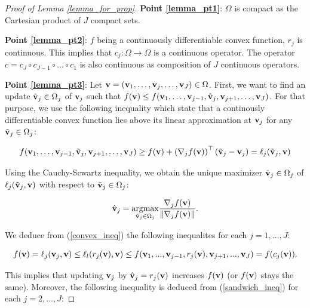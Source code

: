 \documentclass[
]{jss}
\begin{document}
\begin{proof}[Proof of Lemma \ref{lemma_for_prop}]

    \textbf{Point \ref{lemma_pt1}}: $\Omega$ is compact as the Cartesian product 
    of $J$ compact sets.

    \textbf{Point \ref{lemma_pt2}}: $f$ being a continuously differentiable convex 
    function, $r_j$ is continuous. This implies that $c_j: \Omega \to \Omega$ is a 
    continuous operator. The operator  
    $c = c_J \circ c_{J-1} \circ \ldots \circ c_1$ is also continuous as 
    composition of $J$ continuous operators.

    \textbf{Point \ref{lemma_pt3}}: 
    Let $\mathbf{v} = (\mathbf{v}_1, \ldots, \mathbf{v}_j, \ldots, \mathbf{v}_J) \in \Omega$. First, 
    we want to find an update $\hat{\mathbf{v}}_j \in \Omega_j$ of $\mathbf{v}_j$ such that 
    $f(\mathbf{v}) \le f(\mathbf{v}_1, \ldots, \mathbf{v}_{j-1}, \hat{\mathbf{v}}_j, \mathbf{v}_{j+1}, \ldots , \mathbf{v}_J)$. 
    For that purpose, we use the following inequality which state that a 
    continously differentiable convex function lies above its linear approximation 
    at $\mathbf{v}_j$ for any $\tilde{\mathbf{v}}_j \in \Omega_j$:

\begin{equation}
f(\mathbf{v}_1, \ldots, \mathbf{v}_{j-1}, \tilde{\mathbf{v}}_j, \mathbf{v}_{j+1}, \ldots , \mathbf{v}_J) \ge f(\mathbf{v})+  \left(\mathbf{\nabla}_j f(\mathbf{v})\right)^\top (\tilde{\mathbf{v}}_j - \mathbf{v}_j) =  \ell_j(\tilde{\mathbf{v}}_j, \mathbf{v})
\label{convex_ineq}
\end{equation}

Using the Cauchy-Scwartz inequality, we obtain the unique maximizer 
$\hat{\mathbf{v}}_j \in \Omega_j$ of $\ell_j(\tilde{\mathbf{v}}_j, \mathbf{v})$ with  respect 
to $\tilde{\mathbf{v}}_j \in \Omega_j$:

\begin{equation}
\hat{\mathbf{v}}_j  = \underset{\tilde{\mathbf{v}}_j \in \Omega_j}{\text{argmax}} \frac{\mathbf{\nabla}_j f(\mathbf{v})}{\Vert \mathbf{\nabla}_j f(\mathbf{v}) \Vert}.
\end{equation}

We deduce from (\ref{convex_ineq}) the following inequalites for each 
$j = 1, \ldots, J$:

\begin{equation}
f(\mathbf{v}) = \ell_j(\mathbf{v}_j, \mathbf{v})\leq\ell_l(r_j(\mathbf{v}), \mathbf{v})\leq f(\mathbf{v}_1, ..., \mathbf{v}_{j-1}, r_j(\mathbf{v}), \mathbf{v}_{j+1}, ..., \mathbf{v}_J) = f(c_j(\mathbf{v})).
\label{sandwich_ineq}
\end{equation}

This implies that updating $\mathbf{v}_j$ by $\hat{\mathbf{v}}_j = r_j(\mathbf{v})$ increases $f(\mathbf{v})$ (or $f(\mathbf{v})$ stays the same). Moreover, the following inequality is deduced from (\ref{sandwich_ineq}) for each $j = 2, ..., J$:


\end{proof}
\end{document}
